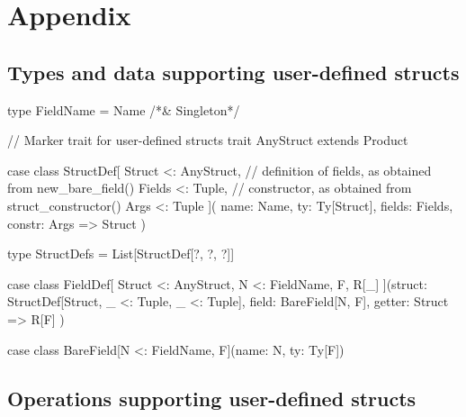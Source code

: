 \documentclass[11pt]{article}
\begin{document}
\clearpage
\appendix

\section{Appendix}
\label{sec:appendix}

\subsection*{Types and data supporting user-defined structs}

\begin{ScalaBlockSimple}
type FieldName = Name /*& Singleton*/

// Marker trait for user-defined structs
trait AnyStruct extends Product

case class StructDef[
  Struct <: AnyStruct,
  // definition of fields, as obtained from new_bare_field()
  Fields <: Tuple,
  // constructor, as obtained from struct_constructor()
  Args   <: Tuple
](
  name: Name,
  ty: Ty[Struct],
  fields: Fields,
  constr: Args => Struct
)

type StructDefs = List[StructDef[?, ?, ?]]

case class FieldDef[
  Struct <: AnyStruct,
  N <: FieldName,
  F,
  R[_]
](struct: StructDef[Struct, _ <: Tuple, _ <: Tuple],
  field: BareField[N, F],
  getter: Struct => R[F]
)

case class BareField[N <: FieldName, F](name: N, ty: Ty[F])
\end{ScalaBlockSimple}

\subsection*{Operations supporting user-defined structs}
\end{document}
